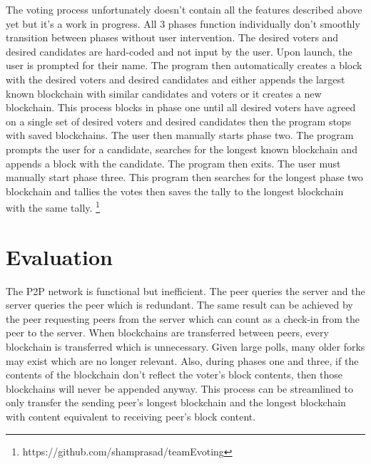 \documentclass[conference]{IEEEtran}
\begin{document}
The voting process unfortunately doesn't contain all the features described above yet but it's a work in progress. All 3 phases function individually don't smoothly transition between phases without user intervention. The desired voters and desired candidates are hard-coded and not input by the user. Upon launch, the user is prompted for their name. The program then automatically creates a block with the desired voters and desired candidates and either appends the largest known blockchain with similar candidates and voters or it creates a new blockchain. This process blocks in phase one until all desired voters have agreed on a single set of desired voters and desired candidates then the program stops with saved blockchains. The user then manually starts phase two. The program prompts the user for a candidate, searches for the longest known blockchain and appends a block with the candidate. The program then exits. The user must manually start phase three. This program then searches for the longest phase two blockchain and tallies the votes then saves the tally to the longest blockchain with the same tally.
\footnote{https://github.com/shamprasad/teamEvoting}

\section{Evaluation}
The P2P network is functional but inefficient. The peer queries the server and the server queries the peer which is redundant. The same result can be achieved by the peer requesting peers from the server which can count as a check-in from the peer to the server. When blockchains are transferred between peers, every blockchain is transferred which is unnecessary. Given large polls, many older forks may exist which are no longer relevant. Also, during phases one and three, if the contents of the blockchain don't reflect the voter's block contents, then those blockchains will never be appended anyway. This process can be streamlined to only transfer the sending peer's longest blockchain and the longest blockchain with content equivalent to receiving peer's block content. 
\end{document}
